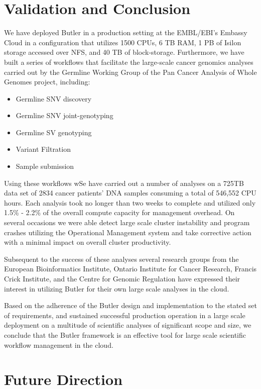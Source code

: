 \section{Validation and Conclusion}
We have deployed Butler in a production setting at the EMBL/EBI's Embassy Cloud in a configuration that utilizes 1500 CPUs, 6 TB RAM, 1 PB of Isilon storage accessed over NFS, and 40 TB of block-storage. Furthermore, we have built a series of workflows that facilitate the large-scale cancer genomics analyses carried out by the Germline Working Group of the Pan Cancer Analysis of Whole Genomes project, including:

\begin{itemize}
\item Germline SNV discovery
\item Germline SNV joint-genotyping
\item Germline SV genotyping
\item Variant Filtration
\item Sample submission
\end{itemize}

Using these workflows wSe have carried out a number of analyses on a 725TB data set of 2834 cancer patients' DNA samples consuming a total of 546,552 CPU hours. Each analysis took no longer than two weeks to complete and utilized only 1.5\% - 2.2\% of the overall compute capacity for management overhead. On several occasions we were able detect large scale cluster instability and program crashes utilizing the Operational Management system and take corrective action with a minimal impact on overall cluster productivity.

Subsequent to the success of these analyses several research groups from the European Bioinformatics Institute, Ontario Institute for Cancer Research, Francis Crick Institute, and the Centre for Genomic Regulation have expressed their interest in utilizing Butler for their own large scale analyses in the cloud.

Based on the adherence of the Butler design and implementation to the stated set of requirements, and sustained successful production operation in a large scale deployment on a multitude of scientific analyses of significant scope and size, we conclude that the Butler framework is an effective tool for large scale scientific workflow management in the cloud.

\section{Future Direction}

